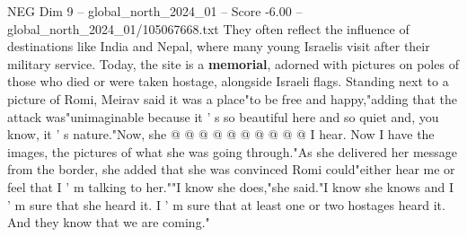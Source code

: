 \begin{textsample}{NEG Dim 9 – global\_north\_2024\_01 – Score -6.00 – global\_north\_2024\_01/105067668.txt}
They often reflect the influence of destinations like India and Nepal, where many young Israelis visit after their military service.
Today, the site is a \textbf{memorial}, adorned with pictures on poles of those who died or were taken hostage, alongside Israeli flags.
Standing next to a picture of Romi, Meirav said it was a place"to be free and happy,"adding that the attack was"unimaginable because it ' s so beautiful here and so quiet and, you know, it ' s nature."Now, she @ @ @ @ @ @ @ @ @ @ I hear.
Now I have the images, the pictures of what she was going through."As she delivered her message from the border, she added that she was convinced Romi could"either hear me or feel that I ' m talking to her.""I know she does,"she said."I know she knows and I ' m sure that she heard it.
I ' m sure that at least one or two hostages heard it.
And they know that we are coming."

\end{textsample}
